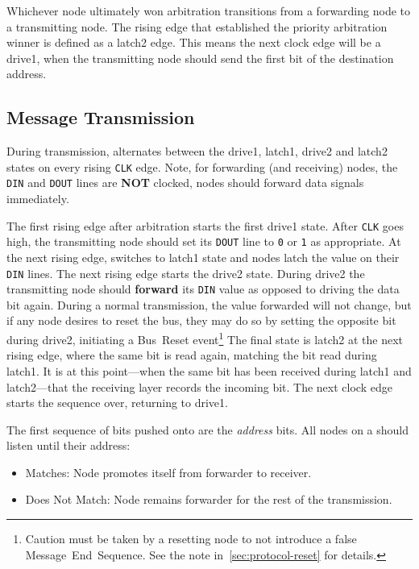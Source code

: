 Whichever node ultimately won arbitration
transitions from a forwarding node to a transmitting node.
The rising edge that established the priority arbitration winner
is defined as a {\sc latch2} edge. This means the next clock edge will be a
{\sc drive1}, when the transmitting node should send the first bit of the
destination address.

\subsection{Message Transmission}
\label{sec:protocol-transmission}
During transmission, \bus alternates between the {\sc drive1}, {\sc latch1},
{\sc drive2} and {\sc latch2} states on every rising {\tt CLK} edge. 
Note, for forwarding (and receiving) nodes, the {\tt DIN} and {\tt DOUT} lines 
are {\bf NOT} clocked, nodes should forward data signals immediately.

The first rising edge after arbitration starts the first {\sc drive1} state.
After {\tt CLK} goes high, the transmitting node should set its {\tt DOUT}
line to {\tt 0} or {\tt 1} as appropriate. At the next rising edge, \bus
switches to {\sc latch1} state and nodes latch the value on their {\tt DIN}
lines. The next rising edge starts the {\sc drive2} state. During {\sc drive2}
the transmitting node should \textbf{forward} its {\tt DIN} value as opposed
to driving the data bit again. During a normal
transmission, the value forwarded will not change, but if any node desires to
reset the bus, they may do so by setting the opposite bit during {\sc drive2},
initiating a Bus~Reset event\footnote{
  Caution must be taken by a resetting node to not introduce a false
  Message~End~Sequence. See the note in~\ref{sec:protocol-reset} for details.}
The final state is {\sc latch2} at the next rising edge, where the same bit is
read again, matching the bit read during {\sc latch1}.  It is at this
point---when the same bit has been received during {\sc latch1} and {\sc
latch2}---that the receiving layer records the incoming bit. The next clock
edge starts the sequence over, returning to {\sc drive1}.

The first sequence of bits pushed onto \bus are the {\em address} bits. All
nodes on a \bus should listen until their address:
\begin{itemize}
  \item Matches: Node promotes itself from forwarder to receiver.
  \item Does Not Match: Node remains forwarder for the rest of the
    transmission.
\end{itemize}

